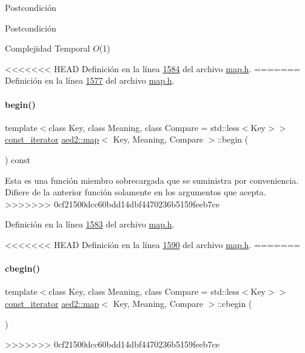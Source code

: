 \begin{DoxyPostcond}{\-Postcondición}
\begin{DoxyPostcond}{\-Postcondición}
\begin{DoxyDescription}
\item[Complejidad Temporal]$O$(1)
\end{DoxyDescription}

<<<<<<< HEAD
\-Definición en la línea \hyperlink{map_8h_source_l01584}{1584} del archivo \hyperlink{map_8h_source}{map.\-h}.
=======
Definición en la línea \hyperlink{map_8h_source_l01577}{1577} del archivo \hyperlink{map_8h_source}{map.\+h}.

\mbox{\label{classaed2_1_1map_af3b1818c2b44e37221cc3b131768555b_af3b1818c2b44e37221cc3b131768555b}} 
\paragraph{\texorpdfstring{begin()}{begin()}\hspace{0.1cm}{\footnotesize\ttfamily [2/2]}}
{\footnotesize\ttfamily template$<$class Key, class Meaning, class Compare = std\+::less$<$\+Key$>$$>$ \\
\hyperlink{classaed2_1_1map_1_1const__iterator}{const\+\_\+iterator} \hyperlink{classaed2_1_1map}{aed2\+::map}$<$ Key, Meaning, Compare $>$\+::begin (\begin{DoxyParamCaption}{ }\end{DoxyParamCaption}) const\hspace{0.3cm}{\ttfamily [inline]}}

Esta es una función miembro sobrecargada que se suministra por conveniencia. Difiere de la anterior función solamente en los argumentos que acepta. 
>>>>>>> 0cf21500dcc60bdd14dbf4470236b5159feeb7ce

Definición en la línea \hyperlink{map_8h_source_l01583}{1583} del archivo \hyperlink{map_8h_source}{map.\+h}.

<<<<<<< HEAD
\-Definición en la línea \hyperlink{map_8h_source_l01590}{1590} del archivo \hyperlink{map_8h_source}{map.\-h}.
=======
\mbox{\label{classaed2_1_1map_ab96ad892caa28f193481a578f4956a2a_ab96ad892caa28f193481a578f4956a2a}} 
\paragraph{\texorpdfstring{cbegin()}{cbegin()}}
{\footnotesize\ttfamily template$<$class Key, class Meaning, class Compare = std\+::less$<$\+Key$>$$>$ \\
\hyperlink{classaed2_1_1map_1_1const__iterator}{const\+\_\+iterator} \hyperlink{classaed2_1_1map}{aed2\+::map}$<$ Key, Meaning, Compare $>$\+::cbegin (\begin{DoxyParamCaption}{ }\end{DoxyParamCaption})\hspace{0.3cm}{\ttfamily [inline]}}
>>>>>>> 0cf21500dcc60bdd14dbf4470236b5159feeb7ce


\end{DoxyPostcond}
\end{DoxyPostcond}

